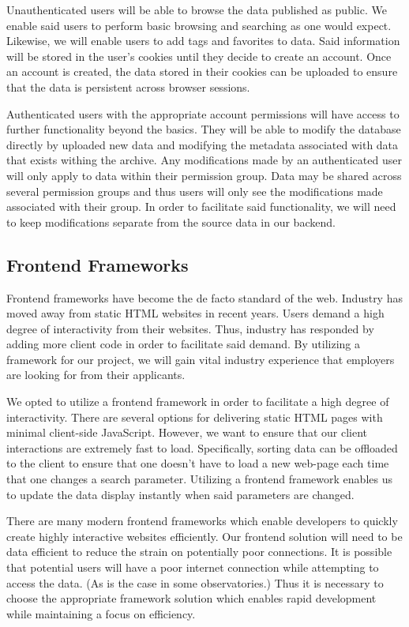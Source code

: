 \documentclass[12pt]{report}
\begin{document}
Unauthenticated users will be able to browse the data published as public. We enable said users to perform basic browsing and searching as one would expect. Likewise, we will enable users to add tags and favorites to data. Said information will be stored in the user's cookies until they decide to create an account. Once an account is created, the data stored in their cookies can be uploaded to ensure that the data is persistent across browser sessions.

Authenticated users with the appropriate account permissions will have access to further functionality beyond the basics. They will be able to modify the database directly by uploaded new data and modifying the metadata associated with data that exists withing the archive. Any modifications made by an authenticated user will only apply to data within their permission group. Data may be shared across several permission groups and thus users will only see the modifications made associated with their group. In order to facilitate said functionality, we will need to keep modifications separate from the source data in our backend.

\subsection*{Frontend Frameworks}

Frontend frameworks have become the de facto standard of the web. Industry has moved away from static HTML websites in recent years. Users demand a high degree of interactivity from their websites. Thus, industry has responded by adding more client code in order to facilitate said demand. By utilizing a framework for our project, we will gain vital industry experience that employers are looking for from their applicants.

We opted to utilize a frontend framework in order to facilitate a high degree of interactivity. There are several options for delivering static HTML pages with minimal client-side JavaScript. However, we want to ensure that our client interactions are extremely fast to load. Specifically, sorting data can be offloaded to the client to ensure that one doesn't have to load a new web-page each time that one changes a search parameter. Utilizing a frontend framework enables us to update the data display instantly when said parameters are changed.

There are many modern frontend frameworks which enable developers to quickly create highly interactive websites efficiently. Our frontend solution will need to be data efficient to reduce the strain on potentially poor connections. It is possible that potential users will have a poor internet connection while attempting to access the data. (As is the case in some observatories.) Thus it is necessary to choose the appropriate framework solution which enables rapid development while maintaining a focus on efficiency.
\end{document}
